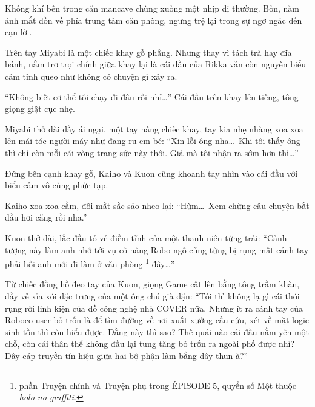 \documentclass[../main.tex]{subfiles}
\begin{document}

Không khí bên trong căn mancave chùng xuống một nhịp dị thường. Bốn, năm ánh mắt dồn về phía trung tâm căn phòng, ngưng trệ lại trong sự ngơ ngác đến cạn lời.

Trên tay Miyabi là một chiếc khay gỗ phẳng. Nhưng thay vì tách trà hay đĩa bánh, nằm trơ trọi chính giữa khay lại là cái đầu của Rikka vẫn còn nguyên biểu cảm tỉnh queo như không có chuyện gì xảy ra.

``Không biết cơ thể tôi chạy đi đâu rồi nhỉ\dots'' Cái đầu trên khay lên tiếng, tông giọng giật cục nhẹ.


Miyabi thở dài đầy ái ngại, một tay nâng chiếc khay, tay kia nhẹ nhàng xoa xoa lên mái tóc người máy như đang ru em bé: ``Xin lỗi ông nha\dots\ Khi tôi thấy ông thì chỉ còn mỗi cái vòng trang sức này thôi. Giá mà tôi nhận ra sớm hơn thì\dots''

Đứng bên cạnh khay gỗ, Kaiho và Kuon cũng khoanh tay nhìn vào cái đầu với biểu cảm vô cùng phức tạp.

Kaiho xoa xoa cằm, đôi mắt sắc sảo nheo lại: ``Hừm\dots\ Xem chừng câu chuyện bắt đầu hơi căng rồi nha.''

Kuon thở dài, lắc đầu tỏ vẻ điềm tĩnh của một thanh niên từng trải: ``Cảnh tượng này làm anh nhớ tới vụ cô nàng Robo-ngố cũng từng bị rụng mất cánh tay phải hồi anh mới đi làm ở văn phòng \hll\footnote{phần {\abv Truyện chính} và {\abv Truyện phụ} trong {\flaregothic ÉPISODE 5}, quyển số Một thuộc \textit{holo no graffiti}.} đây\dots''

Từ chiếc đồng hồ đeo tay của Kuon, giọng Game cất lên bằng tông trầm khàn, đầy vẻ xỉa xói đặc trưng của một ông chú già dặn: ``Tôi thì không lạ gì cái thói rụng rời linh kiện của đồ công nghệ nhà COVER nữa. Nhưng ít ra cánh tay của Roboco-user bỏ trốn là để tìm đường về nơi xuất xưởng cầu cứu, xét về mặt logic sinh tồn thì còn hiểu được. Đằng này thì sao? Thế quái nào cái đầu nằm yên một chỗ, còn cái thân thể không đầu lại tung tăng bỏ trốn ra ngoài phố được nhỉ? Dây cáp truyền tín hiệu giữa hai bộ phận làm bằng dây thun à?''
\end{document}
